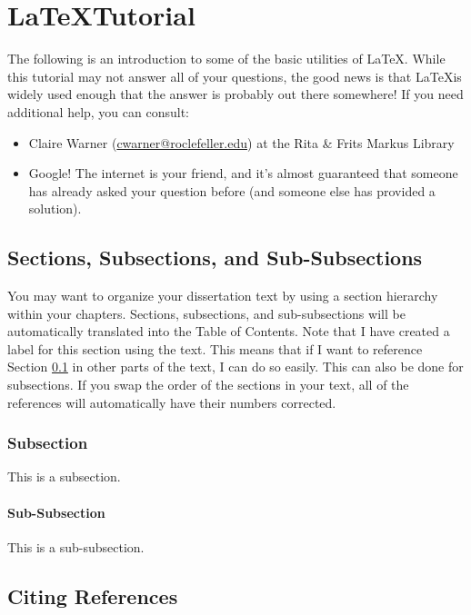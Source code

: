 \chapter*{\LaTeX Tutorial}

The following is an introduction to some of the basic utilities of \LaTeX. While this tutorial may not answer all of your questions, the good news is that \LaTeX is widely used enough that the answer is probably out there somewhere! If you need additional help, you can consult:

\begin{itemize}
    \item Claire Warner (\url{cwarner@roclefeller.edu}) at the Rita \& Frits Markus Library
    \item Google! The internet is your friend, and it's almost guaranteed that someone has already asked your question before (and someone else has provided a solution). 
\end{itemize}

\section{Sections, Subsections, and Sub-Subsections} \label{sections}

You may want to organize your dissertation text by using a section hierarchy within your chapters. Sections, subsections, and sub-subsections will be automatically translated into the Table of Contents. Note that I have created a label for this section using the text. This means that if I want to reference Section \ref{sections} in other parts of the text, I can do so easily. This can also be done for subsections. If you swap the order of the sections in your text, all of the references will automatically have their numbers corrected.

\subsection{Subsection}

This is a subsection.

\subsubsection{Sub-Subsection}

This is a sub-subsection.

\section{Citing References}

